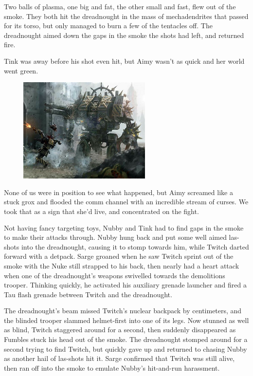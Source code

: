 Two balls of plasma, one big and fat, the other small and fast, flew out of the smoke. 
They both hit the dreadnought in the mass of mechadendrites that passed for its torso, but only managed to burn a few of the tentacles off. 
The dreadnought aimed down the gaps in the smoke the shots had left, and returned fire. 


Tink was away before his shot even hit, but Aimy wasn't as quick and her world went green.

\begin{figure}
	\begin{center}
		\includegraphics[width=\figwidth]{pics/11/79.png}
	\end{center}
\end{figure}
None of us were in position to see what happened, but Aimy screamed like a stuck grox and flooded the comm channel with an incredible stream of curses. 
We took that as a sign that she'd live, and concentrated on the fight.

Not having fancy targeting toys, Nubby and Tink had to find gaps in the smoke to make their attacks through. 
Nubby hung back and put some well aimed las-shots into the dreadnought, causing it to stomp towards him, while Twitch darted forward with a detpack. 
Sarge groaned when he saw Twitch sprint out of the smoke with the Nuke still strapped to his back, then nearly had a heart attack when one of the dreadnought's weapons swivelled towards the demolitions trooper. 
Thinking quickly, he activated his auxiliary grenade launcher and fired a Tau flash grenade between Twitch and the dreadnought.

The dreadnought's beam missed Twitch's nuclear backpack by centimeters, and the blinded trooper slammed helmet-first into one of its legs. 
Now stunned as well as blind, Twitch staggered around for a second, then suddenly disappeared as Fumbles stuck his head out of the smoke. 
The dreadnought stomped around for a second trying to find Twitch, but quickly gave up and returned to chasing Nubby as another hail of las-shots hit it. 
Sarge confirmed that Twitch was still alive, then ran off into the smoke to emulate Nubby's hit-and-run harassment.

